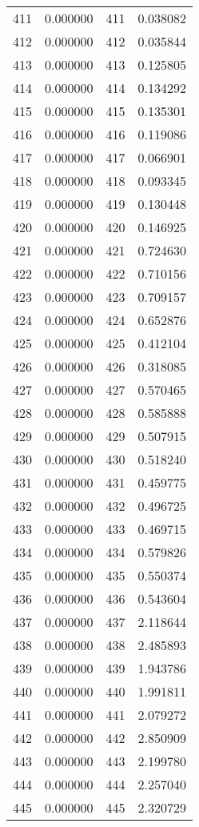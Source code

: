 \documentclass[12pt]{article}
\begin{document}
\begin{longtable}{@{}cccc@{}}
411 & 0.000000 & 411 & 0.038082 \\
412 & 0.000000 & 412 & 0.035844 \\
413 & 0.000000 & 413 & 0.125805 \\
414 & 0.000000 & 414 & 0.134292 \\
415 & 0.000000 & 415 & 0.135301 \\
416 & 0.000000 & 416 & 0.119086 \\
417 & 0.000000 & 417 & 0.066901 \\
418 & 0.000000 & 418 & 0.093345 \\
419 & 0.000000 & 419 & 0.130448 \\
420 & 0.000000 & 420 & 0.146925 \\
421 & 0.000000 & 421 & 0.724630 \\
422 & 0.000000 & 422 & 0.710156 \\
423 & 0.000000 & 423 & 0.709157 \\
424 & 0.000000 & 424 & 0.652876 \\
425 & 0.000000 & 425 & 0.412104 \\
426 & 0.000000 & 426 & 0.318085 \\
427 & 0.000000 & 427 & 0.570465 \\
428 & 0.000000 & 428 & 0.585888 \\
429 & 0.000000 & 429 & 0.507915 \\
430 & 0.000000 & 430 & 0.518240 \\
431 & 0.000000 & 431 & 0.459775 \\
432 & 0.000000 & 432 & 0.496725 \\
433 & 0.000000 & 433 & 0.469715 \\
434 & 0.000000 & 434 & 0.579826 \\
435 & 0.000000 & 435 & 0.550374 \\
436 & 0.000000 & 436 & 0.543604 \\
437 & 0.000000 & 437 & 2.118644 \\
438 & 0.000000 & 438 & 2.485893 \\
439 & 0.000000 & 439 & 1.943786 \\
440 & 0.000000 & 440 & 1.991811 \\
441 & 0.000000 & 441 & 2.079272 \\
442 & 0.000000 & 442 & 2.850909 \\
443 & 0.000000 & 443 & 2.199780 \\
444 & 0.000000 & 444 & 2.257040 \\
445 & 0.000000 & 445 & 2.320729 \\

\end{longtable}
\end{document}
